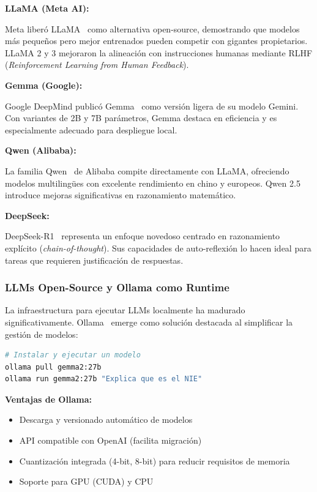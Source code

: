 \textbf{LLaMA (Meta AI):}

Meta liber\'o LLaMA~\cite{touvron2023llama} como alternativa open-source, demostrando que modelos m\'as peque\~nos pero mejor entrenados pueden competir con gigantes propietarios. LLaMA 2 y 3 mejoraron la alineaci\'on con instrucciones humanas mediante RLHF (\textit{Reinforcement Learning from Human Feedback}).

\textbf{Gemma (Google):}

Google DeepMind public\'o Gemma~\cite{team2024gemma} como versi\'on ligera de su modelo Gemini. Con variantes de 2B y 7B par\'ametros, Gemma destaca en eficiencia y es especialmente adecuado para despliegue local.

\textbf{Qwen (Alibaba):}

La familia Qwen~\cite{yang2024qwen2} de Alibaba compite directamente con LLaMA, ofreciendo modelos multiling\"ues con excelente rendimiento en chino y europeos. Qwen 2.5 introduce mejoras significativas en razonamiento matem\'atico.

\textbf{DeepSeek:}

DeepSeek-R1~\cite{deepseek2024r1} representa un enfoque novedoso centrado en razonamiento expl\'icito (\textit{chain-of-thought}). Sus capacidades de auto-reflexi\'on lo hacen ideal para tareas que requieren justificaci\'on de respuestas.

\subsubsection{LLMs Open-Source y Ollama como Runtime}
\label{subsubsec:ollama}

La infraestructura para ejecutar LLMs localmente ha madurado significativamente. Ollama~\cite{ollama2023} emerge como soluci\'on destacada al simplificar la gesti\'on de modelos:

\begin{lstlisting}[language=bash, caption={Ejemplo de uso de Ollama.}]
# Instalar y ejecutar un modelo
ollama pull gemma2:27b
ollama run gemma2:27b "Explica que es el NIE"
\end{lstlisting}

\textbf{Ventajas de Ollama:}
\begin{itemize}
    \item Descarga y versionado autom\'atico de modelos
    \item API compatible con OpenAI (facilita migraci\'on)
    \item Cuantizaci\'on integrada (4-bit, 8-bit) para reducir requisitos de memoria
    \item Soporte para GPU (CUDA) y CPU
\end{itemize}

